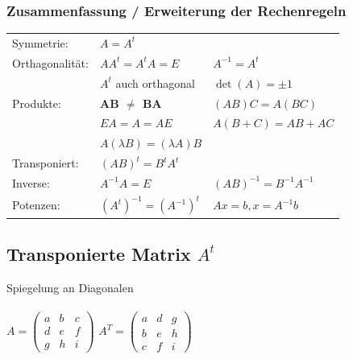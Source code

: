    			\subsubsection{Zusammenfassung / Erweiterung der Rechenregeln}
   			\begin{tabular}{lll}
   			Symmetrie: & $ A = A^t$ \\   			
   			Orthagonalität: &  $ A A^t = A^t A = E $  & $A^{-1} = A^t$\\
   			& $A^t$ auch orthagonal & $\det(A) = \pm 1$ \\
   			Produkte: & \textbf{AB $\neq$ BA} & $(AB)C = A(BC)$\\
   			& $EA = A = AE$  & $A(B + C) = AB + AC$\\
   			& $A (\lambda B) = (\lambda A) B$ & \\
   			Transponiert: & $(AB)^t = B^t A^t $ \\
   			Inverse: & $A^{-1} A = E$ & $(AB)^{-1} = B^{-1} A^{-1} $ \\
   			Potenzen: & $(A^t)^{-1} = (A^{-1})^t $ & $Ax = b, x = A^{-1}b$\\
   			\end{tabular}
		    
		    
		    \subsection{Transponierte Matrix $A^t$}
		    Spiegelung an Diagonalen \\
		    \\
		    $A=\begin{pmatrix}
				a&b&c\\
				d&e&f\\
				g&h&i
			\end{pmatrix}$ \quad $ A^T =\begin{pmatrix}
				a&d&g\\
				b&e&h\\
				c&f&i
			\end{pmatrix}$    
		        
		        
